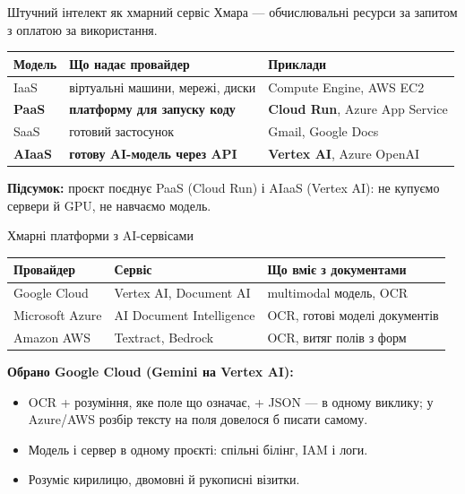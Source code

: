 \documentclass[aspectratio=169,11pt]{beamer}
\newcommand{\summary}[1]{\par\medskip\textbf{Підсумок:} #1}
\begin{document}
\begin{frame}{Штучний інтелект як хмарний сервіс}
  Хмара --- обчислювальні ресурси за запитом з оплатою за використання.

  \smallskip
  \begin{tabular}{L{0.37\textwidth}L{0.31\textwidth}L{0.26\textwidth}}
    \toprule
    \textbf{Модель} & \textbf{Що надає провайдер} & \textbf{Приклади} \\
    \midrule
    IaaS  & віртуальні машини, мережі, диски & Compute Engine, AWS EC2 \\
    \textbf{PaaS}  & \textbf{платформу для запуску коду} & \textbf{Cloud Run}, Azure App Service \\
    SaaS  & готовий застосунок & Gmail, Google Docs \\
    \textbf{AIaaS}  & \textbf{готову AI-модель через API} & \textbf{Vertex AI}, Azure OpenAI \\
    \bottomrule
  \end{tabular}

  \summary{проєкт поєднує PaaS (Cloud Run) і AIaaS (Vertex AI): не купуємо сервери й GPU, не навчаємо модель.}
\end{frame}

\begin{frame}{Хмарні платформи з AI-сервісами}
  \centering
  \begin{tabular}{lll}
    \toprule
    \textbf{Провайдер} & \textbf{Сервіс} & \textbf{Що вміє з документами} \\
    \midrule
    Google Cloud & Vertex AI, Document AI & multimodal модель, OCR \\
    Microsoft Azure & AI Document Intelligence & OCR, готові моделі документів \\
    Amazon AWS & Textract, Bedrock & OCR, витяг полів з форм \\
    \bottomrule
  \end{tabular}

  \raggedright
  \bigskip
  \textbf{Обрано Google Cloud (Gemini на Vertex AI):}
  \begin{itemize}
    \item OCR + розуміння, яке поле що означає, + JSON --- в одному виклику;
          у Azure/AWS розбір тексту на поля довелося б писати самому.
    \item Модель і сервер в одному проєкті: спільні білінг, IAM і логи.
    \item Розуміє кирилицю, двомовні й рукописні візитки.
  \end{itemize}
\end{frame}
\end{document}
